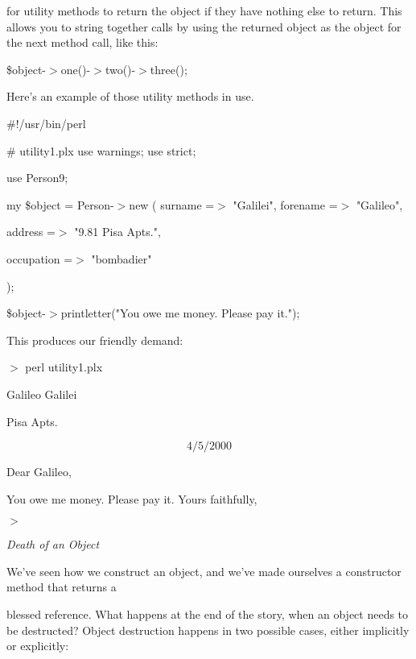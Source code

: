 \documentclass[a4paper,11pt]{book}
\begin{document}
\noindent for utility methods to return the object if they have nothing else to return. This allows you to string together calls by using the returned object as the object for the next method call, like this:

\noindent \$object-$>$one()-$>$two()-$>$three();

\noindent 

\noindent Here's an example of those utility methods in use.

\noindent 

\noindent 

\noindent \#!/usr/bin/perl

\noindent \# utility1.plx use warnings; use strict;

\noindent use Person9;

\noindent 

\noindent my \$object = Person-$>$new ( surname =$>$ "Galilei", forename =$>$ "Galileo",

\noindent address =$>$ "9.81 Pisa Apts.",

\noindent occupation =$>$ "bombadier"

\noindent );

\noindent \$object-$>$printletter("You owe me money. Please pay it.");

\noindent 

\noindent This produces our friendly demand:

\noindent 

\noindent $>$ perl utility1.plx

\noindent Galileo Galilei

 Pisa Apts.

\noindent 

\[4/5/2000\] 


\noindent Dear Galileo,

\noindent You owe me money. Please pay it. Yours faithfully,

\noindent $>$

\noindent 

\noindent \textit{Death of an Object}

\noindent We've seen how we construct an object, and we've made ourselves a constructor method that returns a

\noindent blessed reference. What happens at the end of the story, when an object needs to be destructed? Object destruction happens in two possible cases, either implicitly or explicitly:

\noindent 
\end{document}
